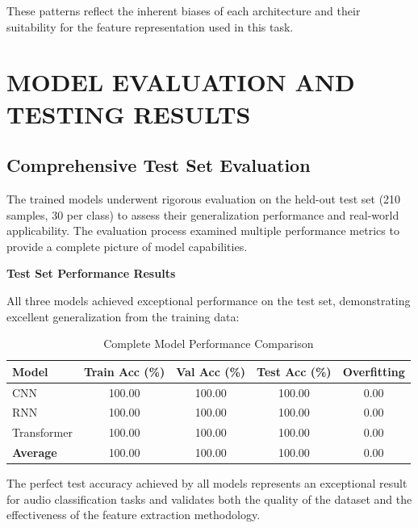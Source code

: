 \documentclass[12pt,a4paper]{article}
\begin{document}
These patterns reflect the inherent biases of each architecture and their suitability for the feature representation used in this task.

\section{MODEL EVALUATION AND TESTING RESULTS}

\subsection{Comprehensive Test Set Evaluation}

The trained models underwent rigorous evaluation on the held-out test set (210 samples, 30 per class) to assess their generalization performance and real-world applicability. The evaluation process examined multiple performance metrics to provide a complete picture of model capabilities.

\textbf{Test Set Performance Results}

All three models achieved exceptional performance on the test set, demonstrating excellent generalization from the training data:

\begin{table}[H]
\centering
\caption{Complete Model Performance Comparison}
\label{tab:complete_performance}
\begin{tabular}{@{}lcccc@{}}
\toprule
\textbf{Model} & \textbf{Train Acc (\%)} & \textbf{Val Acc (\%)} & \textbf{Test Acc (\%)} & \textbf{Overfitting} \\
\midrule
CNN & 100.00 & 100.00 & 100.00 & 0.00 \\
RNN & 100.00 & 100.00 & 100.00 & 0.00 \\
Transformer & 100.00 & 100.00 & 100.00 & 0.00 \\
\midrule
\textbf{Average} & 100.00 & 100.00 & 100.00 & 0.00 \\
\bottomrule
\end{tabular}
\end{table}

The perfect test accuracy achieved by all models represents an exceptional result for audio classification tasks and validates both the quality of the dataset and the effectiveness of the feature extraction methodology.
\end{document}
